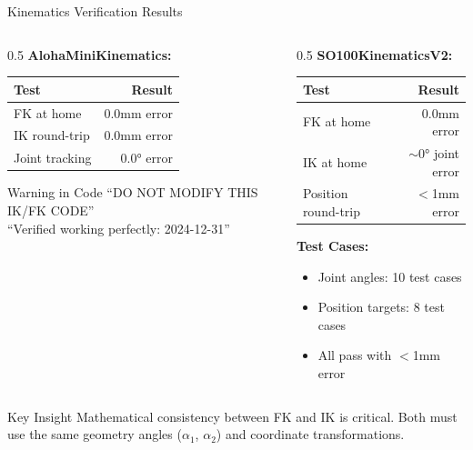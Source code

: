 \begin{frame}[shrink=5]{Kinematics Verification Results}
\begin{columns}
\begin{column}{0.5\textwidth}
    \textbf{AlohaMiniKinematics:}
    \begin{table}
    \centering
    \footnotesize
    \begin{tabular}{lr}
    \toprule
    \textbf{Test} & \textbf{Result} \\
    \midrule
    FK at home & 0.0mm error \\
    IK round-trip & 0.0mm error \\
    Joint tracking & 0.0° error \\
    \bottomrule
    \end{tabular}
    \end{table}

    \vspace{0.2cm}

    \begin{alertblock}{Warning in Code}
    \scriptsize
    ``DO NOT MODIFY THIS IK/FK CODE''\\
    ``Verified working perfectly: 2024-12-31''
    \end{alertblock}
\end{column}
\begin{column}{0.5\textwidth}
    \textbf{SO100KinematicsV2:}
    \begin{table}
    \centering
    \footnotesize
    \begin{tabular}{lr}
    \toprule
    \textbf{Test} & \textbf{Result} \\
    \midrule
    FK at home & 0.0mm error \\
    IK at home & $\sim$0° joint error \\
    Position round-trip & $<$1mm error \\
    \bottomrule
    \end{tabular}
    \end{table}

    \vspace{0.2cm}

    \textbf{Test Cases:}
    \begin{itemize}
        \item Joint angles: 10 test cases
        \item Position targets: 8 test cases
        \item All pass with $<$1mm error
    \end{itemize}
\end{column}
\end{columns}

\vspace{0.2cm}

\begin{block}{Key Insight}
\small Mathematical consistency between FK and IK is critical. Both must use the same geometry angles ($\alpha_1$, $\alpha_2$) and coordinate transformations.
\end{block}
\end{frame}

